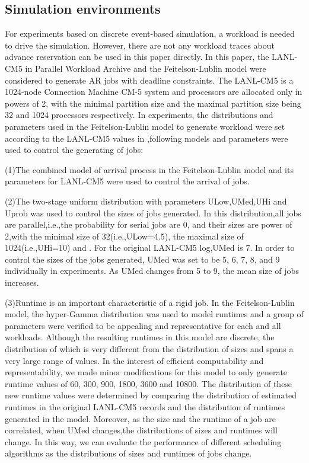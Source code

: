 \documentclass[preprint,12pt]{elsarticle}
\begin{document}
\subsection{Simulation environments}

For experiments based on discrete event-based simulation, a workload is needed to
drive the simulation. However, there are not any workload traces about advance reservation can be
used in this paper directly. In this paper, the LANL-CM5 in Parallel Workload Archive\cite{pwa} and the Feitelson-Lublin model\cite{lublin2003workload} were considered to generate AR jobs with deadline constraints. The LANL-CM5 is a 1024-node Connection Machine CM-5 system and processors are allocated only in powers of 2, with the minimal partition size and the maximal partition size being 32 and 1024 processors respectively. In experiments, the distributions and parameters used in the Feitelson-Lublin model to generate workload were set according to the LANL-CM5 values in \cite{lublin2003workload},following models and parameters were used to control the generating of jobs:

(1)The combined model of arrival process in the Feitelson-Lublin model and its parameters for LANL-CM5 were used to control the arrival of jobs.

(2)The two-stage uniform distribution with parameters ULow,UMed,UHi and Uprob was used to control the sizes of jobs generated. In this distribution,all jobs are parallel,i.e.,the probability for serial jobs are 0, and their sizes are power of 2,with the minimal size of 32(i.e.,ULow=4.5), the maximal size of 1024(i.e.,UHi=10) and . For the original LANL-CM5 log,UMed is 7. In order to control the sizes of the jobs generated, UMed was set to be 5, 6, 7, 8, and 9 individually in experiments. As UMed changes from 5 to 9, the mean size of jobs increases.

(3)Runtime is an important characteristic of a rigid job. In the Feitelson-Lublin model, the hyper-Gamma distribution was used to model runtimes and a group of parameters were verified to be appealing and representative for each and all workloads. Although the resulting runtimes in this model are discrete, the distribution of which is very different from the distribution of sizes and spans a very large range of values. In the interest of efficient computability and representability,  we made minor modifications for this model to only generate runtime values of 60, 300, 900, 1800, 3600 and 10800. The distribution of these new runtime values were determined by comparing the distribution of estimated runtimes in the original LANL-CM5 records and the distribution of runtimes generated in the model. Moreover, as the size and the runtime of a job are correlated, when UMed changes,the distributions of sizes and runtimes will change. In this way, we can evaluate the performance of different scheduling algorithms as the distributions of sizes and runtimes of jobs change.
\end{document}
